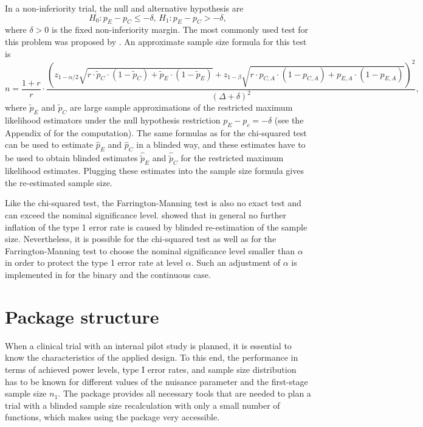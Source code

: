 In a non-inferiority trial, the null and alternative hypothesis are
\[H_0: p_E - p_C \leq - \delta \text{, } H_1: p_E - p_C > -\delta,\]
where \(\delta > 0\) is the fixed non-inferiority margin. The most
commonly used test for this problem was proposed by \citet{FM1990}.
An approximate sample size formula for this test is
\[n = \frac{1 + r}{r} \cdot \frac{\left(z_{1 - \alpha / 2} 
\sqrt{r \cdot \tilde{p}_C \cdot \left(1 - \tilde{p}_C\right) + 
\tilde{p}_E \cdot \left(1 - \tilde{p}_E \right)} + z_{1 - \beta}
\sqrt{r \cdot p_{C,A} \cdot \left(1 - p_{C,A}\right) + 
p_{E,A} \cdot \left(1 - p_{E,A}\right)} \right)^2}{\left(\Delta + \delta\right)^2},\] where
\(\tilde{p}_{E}\) and \(\tilde{p}_{C}\) are large sample approximations
of the restricted maximum likelihood estimators under the null
hypothesis restriction \(p_E - p_c = - \delta\) (see the Appendix of
\citet{FM1990} for the computation). The same formulas as for the
chi-squared test can be used to estimate \(\hat{p}_E\) and \(\hat{p}_C\)
in a blinded way, and these estimates have to be used to obtain blinded
estimates \(\hat{\tilde{p}}_E\) and \(\hat{\tilde{p}}_C\) for the
restricted maximum likelihood estimates. Plugging these estimates into
the sample size formula gives the re-estimated sample size.

Like the chi-squared test, the Farrington-Manning test is also no exact
test and can exceed the nominal significance level. \citet{Friede2007}
showed that in general no further inflation of the type 1 error rate is
caused by blinded re-estimation of the sample size. Nevertheless, it is
possible for the chi-squared test as well as for the Farrington-Manning
test to choose the nominal significance level smaller than \(\alpha\) in
order to protect the type 1 error rate at level \(\alpha\). Such an
adjustment of \(\alpha\) is implemented in  for the
binary and the continuous case.

\hypertarget{package-structure}{%
\section{Package structure}\label{package-structure}}

When a clinical trial with an internal pilot study is planned, it is
essential to know the characteristics of the applied design. To this
end, the performance in terms of achieved power levels, type I error
rates, and sample size distribution has to be known for different values
of the nuisance parameter and the first-stage sample size \(n_1\). The
package  provides all necessary tools that are needed
to plan a trial with a blinded sample size recalculation with only a
small number of functions, which makes using the package very
accessible.

